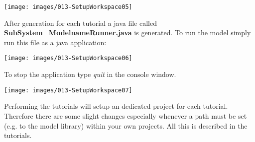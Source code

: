 \texttt{[image: images/013-SetupWorkspace05]}

After generation for each tutorial a java file called \textbf{SubSystem\_ModelnameRunner.java} is generated. To run the model simply run this file as a java application:

\texttt{[image: images/013-SetupWorkspace06]}

To stop the application type \textit{quit} in the console window.
 
\texttt{[image: images/013-SetupWorkspace07]} 

Performing the tutorials will setup an dedicated project for each tutorial. Therefore there are some slight changes especially whenever a path must be set (e.g. to the model library) within your own projects. All this is described in the tutorials.
